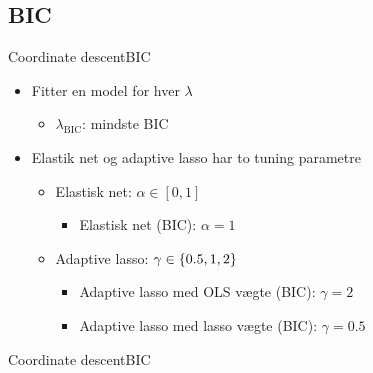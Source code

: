 \subsection{BIC}
\begin{frame}{Coordinate descent}{BIC}
\begin{itemize}
\item Fitter en model for hver $\lambda$
\begin{itemize}
\item $\lambda_{\text{BIC}}$: mindste BIC
\end{itemize}
\item Elastik net og adaptive lasso har to tuning parametre 
\begin{itemize}
\item Elastisk net: $\alpha \in [0,1]$ 
\begin{itemize}
\item Elastisk net (BIC): $\alpha = 1$
\end{itemize}
\item Adaptive lasso: $\gamma \in \cbr{0.5, 1, 2}$
\begin{itemize}
\item Adaptive lasso med OLS vægte (BIC): $\gamma = 2$
\item Adaptive lasso med lasso vægte (BIC): $\gamma = 0.5$
\end{itemize}
\end{itemize}
\end{itemize}
\end{frame}


\begin{frame}{Coordinate descent}{BIC}

\end{frame}


